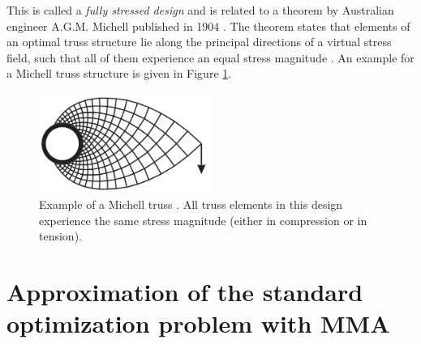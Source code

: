 This is called a \emph{fully stressed design} and is related to a theorem by Australian engineer A.G.M. Michell published in 1904 \cite{Michell1904}. The theorem states that elements of an optimal truss structure lie along the principal directions of a virtual stress field, such that all of them experience an equal stress magnitude \cite{Arora2019}.
An example for a Michell truss structure is given in Figure \ref{fig:michell}.

\begin{figure}[!htpb]
    \centering
    \includegraphics[width=0.5\textwidth]{figures/michell.png}
    \caption{Example of a Michell truss \cite{Picelli2015}. All truss elements in this design experience the same stress magnitude (either in compression or in tension).}
    \label{fig:michell}
\end{figure}

\section{Approximation of the standard optimization problem with MMA}
\label{sec:sizing:mma}

